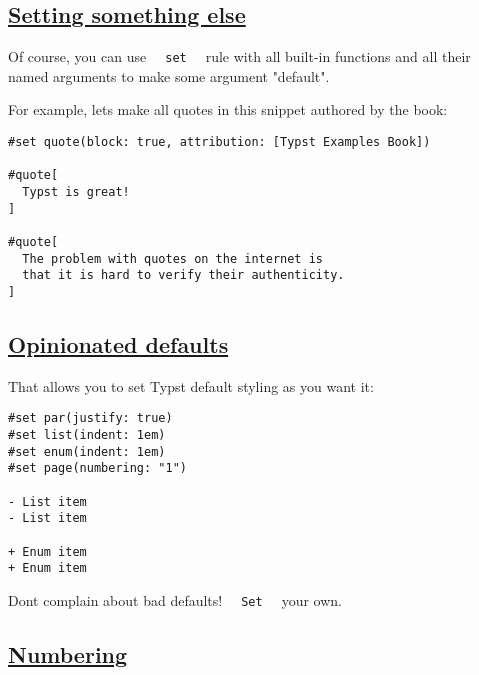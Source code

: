\subsection{\texorpdfstring{\hyperref[setting-something-else]{Setting
something else}}{Setting something else}}\label{setting-something-else}

Of course, you can use \texttt{\ }{\texttt{\ set\ }}\texttt{\ } rule
with all built-in functions and all their named arguments to make some
argument "default".

For example, let\textquotesingle s make all quotes in this snippet
authored by the book:

\begin{verbatim}
#set quote(block: true, attribution: [Typst Examples Book])

#quote[
  Typst is great!
]

#quote[
  The problem with quotes on the internet is
  that it is hard to verify their authenticity.
]
\end{verbatim}

\pandocbounded{}

\subsection{\texorpdfstring{\hyperref[opinionated-defaults]{Opinionated
defaults}}{Opinionated defaults}}\label{opinionated-defaults}

That allows you to set Typst default styling as you want it:

\begin{verbatim}
#set par(justify: true)
#set list(indent: 1em)
#set enum(indent: 1em)
#set page(numbering: "1")

- List item
- List item

+ Enum item
+ Enum item
\end{verbatim}

\pandocbounded{}

Don\textquotesingle t complain about bad defaults!
\texttt{\ }{\texttt{\ Set\ }}\texttt{\ } your own.

\subsection{\texorpdfstring{\hyperref[numbering]{Numbering}}{Numbering}}\label{numbering}

